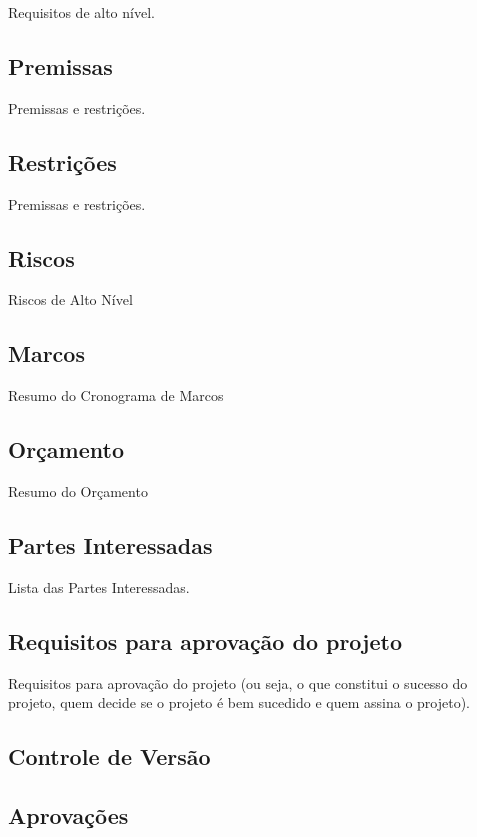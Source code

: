 Requisitos de alto nível.

\subsection{Premissas}

Premissas e restrições.

\subsection{Restrições}

Premissas e restrições.

\subsection{Riscos}

Riscos de Alto Nível

\subsection{Marcos}

Resumo do Cronograma de Marcos

\subsection{Orçamento}

Resumo do Orçamento

\subsection{Partes Interessadas}

Lista das Partes Interessadas.

\subsection{Requisitos para aprovação do projeto}

Requisitos para aprovação do projeto (ou seja, o que constitui o sucesso do projeto, quem decide se
o projeto é bem sucedido e quem assina o projeto).

\subsection{Controle de Versão}

\subsection{Aprovações}

